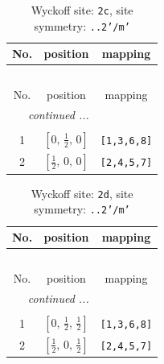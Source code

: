 \documentclass[fleqn,8pt]{jsarticle}
\begin{document}
\renewcommand{\arraystretch}{1.2}
\begin{longtable}{ccc}
\caption{Wyckoff site: {\tt 2c}, site symmetry: {\tt ..2'/m'}}
 \\
 \hline \hline
No. & position & mapping \\ \hline \endfirsthead

\multicolumn{2}{l}{\tablename\ \thetable{}} \\
 \hline \hline
No. & position & mapping \\ \hline \endhead

 \hline \hline
\multicolumn{2}{r}{\footnotesize\it continued ...} \\ \endfoot

 \hline \hline
\multicolumn{2}{r}{} \\ \endlastfoot

1 & $\left[ 0,\, \frac{1}{2},\, 0 \right]$ & {\tt [1,3,6,8]} \\ \hline
2 & $\left[ \frac{1}{2},\, 0,\, 0 \right]$ & {\tt [2,4,5,7]} \\
\end{longtable}
\renewcommand{\arraystretch}{1.2}
\begin{longtable}{ccc}
\caption{Wyckoff site: {\tt 2d}, site symmetry: {\tt ..2'/m'}}
 \\
 \hline \hline
No. & position & mapping \\ \hline \endfirsthead

\multicolumn{2}{l}{\tablename\ \thetable{}} \\
 \hline \hline
No. & position & mapping \\ \hline \endhead

 \hline \hline
\multicolumn{2}{r}{\footnotesize\it continued ...} \\ \endfoot

 \hline \hline
\multicolumn{2}{r}{} \\ \endlastfoot

1 & $\left[ 0,\, \frac{1}{2},\, \frac{1}{2} \right]$ & {\tt [1,3,6,8]} \\ \hline
2 & $\left[ \frac{1}{2},\, 0,\, \frac{1}{2} \right]$ & {\tt [2,4,5,7]} \\
\end{longtable}
\renewcommand{\arraystretch}{1.2}
\end{document}
